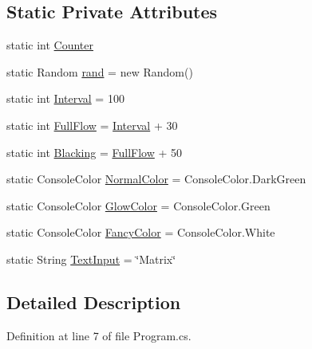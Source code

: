 \subsection*{Static Private Attributes}
\begin{DoxyCompactItemize}
\item 
static int \hyperlink{classmatrix_1_1_program_a7ebfe2b7ace6afb02108a7d38abb6f1b}{Counter}
\item 
static Random \hyperlink{classmatrix_1_1_program_a0920a8f72e5a9fcf1cc1bfcab61a2c31}{rand} = new Random()
\item 
static int \hyperlink{classmatrix_1_1_program_a6c872786668501a3f17cddb985c7ade0}{Interval} = 100
\item 
static int \hyperlink{classmatrix_1_1_program_a33abdd7b74a13e027d920fddb65cce35}{Full\-Flow} = \hyperlink{classmatrix_1_1_program_a6c872786668501a3f17cddb985c7ade0}{Interval} + 30
\item 
static int \hyperlink{classmatrix_1_1_program_a48b4255583a63007038c6c61bd50672b}{Blacking} = \hyperlink{classmatrix_1_1_program_a33abdd7b74a13e027d920fddb65cce35}{Full\-Flow} + 50
\item 
static Console\-Color \hyperlink{classmatrix_1_1_program_ab208e57b1469c5728605ac04b0eae86c}{Normal\-Color} = Console\-Color.\-Dark\-Green
\item 
static Console\-Color \hyperlink{classmatrix_1_1_program_ae5ddcc0d3f98613073560fa4e3d66f5b}{Glow\-Color} = Console\-Color.\-Green
\item 
static Console\-Color \hyperlink{classmatrix_1_1_program_a20f58f721e0c5cdf3b4f519bb7ef872a}{Fancy\-Color} = Console\-Color.\-White
\item 
static String \hyperlink{classmatrix_1_1_program_a4261f7dfcf193d03c22afd544ac71010}{Text\-Input} = \char`\"{}Matrix\char`\"{}
\end{DoxyCompactItemize}


\subsection{Detailed Description}


Definition at line 7 of file Program.\-cs.




